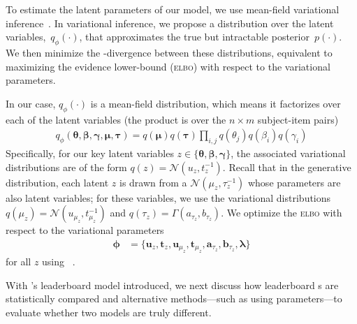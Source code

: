 To estimate the latent parameters of our model, we use mean-field
variational inference~\cite{jordan-99}.
In variational inference, we propose a distribution over the latent
variables,~$q_\phi(\cdot)$, that approximates the true but intractable
posterior~$p(\cdot)$.
We then minimize the -divergence between these distributions,
equivalent to maximizing the evidence lower-bound (\textsc{elbo}) with
respect to the variational parameters.

In our case, $q_\phi(\cdot)$ is a mean-field distribution, which means it
factorizes over each of the latent variables (the product is over the
$n \times m$ subject-item pairs)
\begin{align*}
  q_\phi(\bm{\theta}, \bm{\beta}, \bm{\gamma}, \bm{\mu}, \bm{\tau}) = q(\bm{\mu})q(\bm{\tau})\prod_{i,j} q(\theta_j)q(\beta_i)q(\gamma_i)
\end{align*}
Specifically, for our key latent variables $z \in \{\bm{\theta}, \bm{\beta}, \bm{\gamma}\}$, the associated variational distributions are of the form $q(z) = \mathcal{N}(u_z, t_z^{-1})$.
Recall that in the generative distribution, each latent $z$ is drawn from a $\mathcal{N}(\mu_z, \tau_z^{-1})$ whose parameters are also latent variables; for these variables, we use the variational distributions $q(\mu_z) = \mathcal{N}(u_{\mu_z}, t_{\mu_z}^{-1})$ and $q(\tau_z) = \Gamma(a_{\tau_z}, b_{\tau_z})$. We optimize the \textsc{elbo} with respect to the variational parameters
\begin{align*}
  \bm{\phi} & =\{\bm{u}_z,\bm{t}_z,\bm{u}_{\mu_z},\bm{t}_{\mu_z},\bm{a}_{\tau_z},\bm{b}_{\tau_z},\bm{\lambda}\}
\end{align*}
for all $z$ using ~\citep{Kingma2014AdamAM}.

With \name{}'s leaderboard \irt{} model introduced, we next discuss
how leaderboard \subj{}s are statistically compared and alternative
methods---such as using \irt{} parameters---to evaluate whether two
models are truly different.
